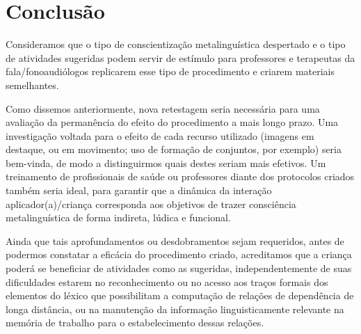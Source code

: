 \documentclass[output=paper,colorlinks,citecolor=brown,booklanguage=portuguese]{langscibook}
\begin{document}
\section{Conclusão}
Consideramos que o tipo de conscientização metalinguística despertado e o tipo de atividades sugeridas podem servir de estímulo para professores e terapeutas da fala/fonoaudiólogos replicarem esse tipo de procedimento e criarem materiais semelhantes. 

Como dissemos anteriormente, nova retestagem seria necessária para uma avaliação da permanência do efeito do procedimento a mais longo prazo. Uma investigação voltada para o efeito de cada recurso utilizado (imagens em destaque, ou em movimento; uso de formação de conjuntos, por exemplo) seria bem-vinda, de modo a distinguirmos quais destes seriam mais efetivos. Um treinamento de profissionais de saúde ou professores diante dos protocolos criados também seria ideal, para garantir que a dinâmica da interação aplicador(a)/criança corresponda aos objetivos de trazer consciência metalinguística de forma indireta, lúdica e funcional. 

Ainda que tais aprofundamentos ou desdobramentos sejam requeridos, antes de podermos constatar a eficácia do procedimento criado, acreditamos que a criança poderá se beneficiar de atividades como as sugeridas, independentemente de suas dificuldades estarem no reconhecimento ou no acesso aos traços formais dos elementos do léxico que possibilitam a computação de relações de dependência de longa distância, ou na manutenção da informação linguisticamente relevante na memória de trabalho para o estabelecimento dessas relações.  


{\sloppy\printbibliography[heading=subbibliography,notkeyword=this]}
\end{document}
